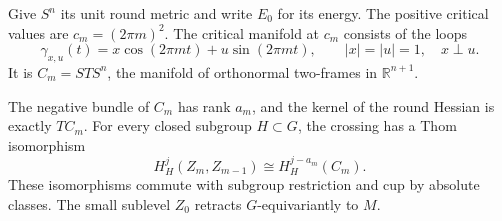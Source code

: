 Give \(S^n\) its unit round metric and write \(E_0\) for its energy.
The positive critical values are \(c_m=(2\pi m)^2\).
The critical manifold at \(c_m\) consists of the loops
\begin{equation}
 \gamma_{x,u}(t)=x\cos(2\pi mt)+u\sin(2\pi mt),
 \qquad |x|=|u|=1,\quad x\perp u.
 \label{eqv:round-loops}
\end{equation}
It is \(C_m=STS^n\), the manifold of orthonormal two-frames in
\(\mathbb R^{n+1}\).

\begin{lemma}
\label{eqv:round-attachment}
The negative bundle of \(C_m\) has rank \(a_m\), and the kernel of the
round Hessian is exactly \(TC_m\).
For every closed subgroup \(H\subset G\), the crossing has a Thom
isomorphism
\begin{equation}
 H_H^j(Z_m,Z_{m-1})\cong H_H^{j-a_m}(C_m).
 \label{eqv:crossing-thom}
\end{equation}
These isomorphisms commute with subgroup restriction and cup by
absolute classes.  The small sublevel \(Z_0\) retracts
\(G\)-equivariantly to \(M\).
\end{lemma}

